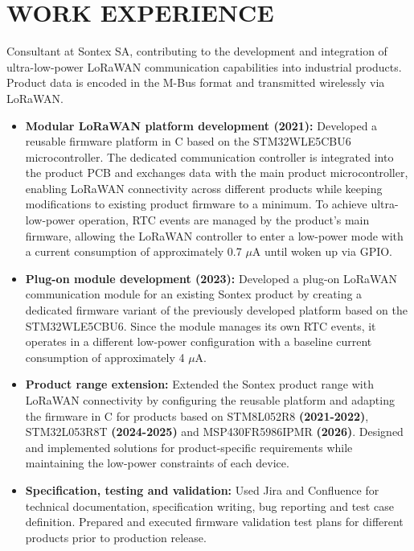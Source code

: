 \documentclass[10pt,a4paper,sans]{moderncv}
\begin{document}
    \section{WORK EXPERIENCE}
    {
        Consultant at Sontex SA, contributing to the development and integration of ultra-low-power LoRaWAN communication capabilities into industrial products. Product data is encoded in the M-Bus format and transmitted wirelessly via LoRaWAN.
        \begin{itemize}
            \item \textbf{Modular LoRaWAN platform development (2021):} Developed a reusable firmware platform in C based on the STM32WLE5CBU6 microcontroller. The dedicated communication controller is integrated into the product PCB and exchanges data with the main product microcontroller, enabling LoRaWAN connectivity across different products while keeping modifications to existing product firmware to a minimum. To achieve ultra-low-power operation, RTC events are managed by the product's main firmware, allowing the LoRaWAN controller to enter a low-power mode with a current consumption of approximately 0.7 $\mu$A until woken up via GPIO.
            \item \textbf{Plug-on module development (2023):} Developed a plug-on LoRaWAN communication module for an existing Sontex product by creating a dedicated firmware variant of the previously developed platform based on the STM32WLE5CBU6. Since the module manages its own RTC events, it operates in a different low-power configuration with a baseline current consumption of approximately 4 $\mu$A.
            \item \textbf{Product range extension:} Extended the Sontex product range with LoRaWAN connectivity by configuring the reusable platform and adapting the firmware in C for products based on STM8L052R8 \textbf{(2021-2022)}, STM32L053R8T \textbf{(2024-2025)} and MSP430FR5986IPMR \textbf{(2026)}. Designed and implemented solutions for product-specific requirements while maintaining the low-power constraints of each device.
            \item \textbf{Specification, testing and validation:} Used Jira and Confluence for technical documentation, specification writing, bug reporting and test case definition. Prepared and executed firmware validation test plans for different products prior to production release.
        \end{itemize}
    }
\end{document}
